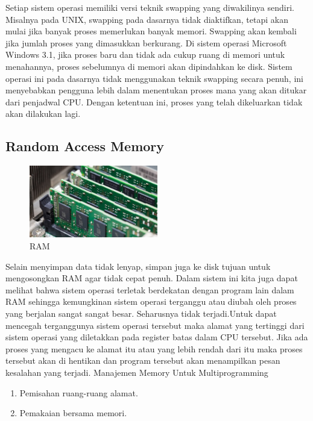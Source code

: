 Setiap sistem operasi memiliki versi teknik swapping yang diwakilinya sendiri. Misalnya pada UNIX, swapping pada dasarnya tidak diaktifkan, tetapi akan mulai jika banyak proses memerlukan banyak memori. Swapping akan kembali jika jumlah proses yang dimasukkan berkurang. Di sistem operasi Microsoft Windows 3.1, jika proses baru dan tidak ada cukup ruang di memori untuk menahannya, proses sebelumnya di memori akan dipindahkan ke disk. Sistem operasi ini pada dasarnya tidak menggunakan teknik swapping secara penuh, ini menyebabkan pengguna lebih dalam menentukan proses mana yang akan ditukar dari penjadwal CPU. Dengan ketentuan ini, proses yang telah dikeluarkan tidak akan dilakukan lagi.

\subsection {Random Access Memory}

\begin{figure}[ht]
\centerline{\includegraphics[width=0.5\textwidth]{figures/ram.jpg}}
\caption{RAM}
\label{ram}
\end{figure}

Selain menyimpan data tidak lenyap, simpan juga ke disk tujuan untuk mengosongkan RAM agar tidak cepat penuh.
Dalam sistem ini kita juga dapat melihat bahwa sistem operasi terletak berdekatan dengan program lain dalam RAM sehingga kemungkinan sistem operasi terganggu atau diubah oleh proses yang berjalan sangat sangat besar. Seharusnya tidak terjadi.Untuk dapat  mencegah terganggunya sistem operasi tersebut maka alamat yang tertinggi dari sistem operasi yang diletakkan pada register batas dalam CPU tersebut. Jika ada proses yang mengacu ke alamat itu atau yang lebih rendah dari itu maka proses tersebut akan di hentikan dan program tersebut akan menampilkan pesan kesalahan yang terjadi. Manajemen Memory  Untuk Multiprogramming
\begin{enumerate}
\item Pemisahan ruang-ruang alamat.
\item Pemakaian bersama memori.
\end{enumerate}


